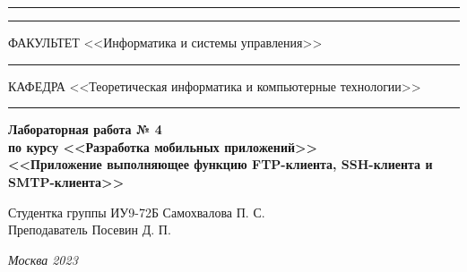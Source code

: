 \documentclass[a4paper, 14pt]{extarticle}
\begin{document}
\begin{titlepage}
\vspace{-25pt}
\hspace{-35pt}\rule{\textwidth}{2.3pt}

\vspace*{-20.3pt}
\hspace{-35pt}\rule{\textwidth}{0.4pt}

\vspace{1.5ex}
\hspace{-35pt} \noindent \small ФАКУЛЬТЕТ\hspace{80pt} <<Информатика и системы управления>>

\vspace*{-16pt}
\hspace{47pt}\rule{0.83\textwidth}{0.4pt}

\vspace{0.5ex}
\hspace{-35pt} \noindent \small КАФЕДРА\hspace{50pt} <<Теоретическая информатика и компьютерные технологии>>

\vspace*{-16pt}
\hspace{30pt}\rule{0.866\textwidth}{0.4pt}
  
\vspace{11em}

\begin{center}
\Large {\bf Лабораторная работа № 4} \\
\large {\bf по курсу <<Разработка мобильных приложений>>} \\
\large {\bf <<Приложение выполняющее функцию FTP-клиента,  SSH-клиента и SMTP-клиента>>} \\
\end{center}\normalsize

\vspace{8em}


\begin{flushright}
  {Студентка группы ИУ9-72Б Самохвалова П. С. \hspace*{15pt}\\
  \vspace{2ex}
  Преподаватель Посевин Д. П.\hspace*{15pt}}
\end{flushright}

\bigskip

\vfill
 

\begin{center}
\textsl{Москва 2023}
\end{center}
\end{titlepage}
\end{document}
